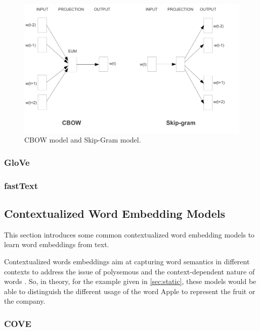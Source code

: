         \begin{figure}[htb]
            \centering
            \includegraphics[scale = 0.15]{Sections/3StateOfTheArt/3_images/Cbow_Skip.png}
            \caption{CBOW model and Skip-Gram model. \cite{Mikolov2013}} 
        \end{figure}

        
        \subsubsection{GloVe}

        \subsubsection{fastText}
    
    \subsection{Contextualized Word Embedding Models}

        \par This section introduces some common contextualized word embedding models to learn word embeddings from text.
        
        \par Contextualized words embeddings aim at capturing word semantics in different contexts to address the issue of polysemous and the context-dependent nature of words \cite{Batista2018}. So, in theory, for the example given in  \ref{sec:static}, these models would be able to distinguish the different usage of the word Apple to represent the fruit or the company.



        \subsubsection{COVE}
